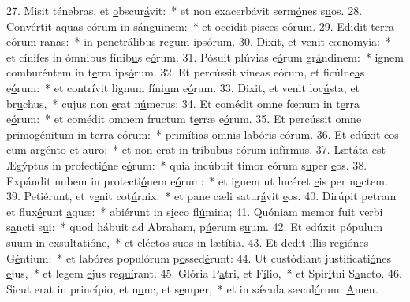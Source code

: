 27. Misit ténebras, et \uline{o}bscur\uline{á}vit:~* et non exacerbávit serm\uline{ó}nes s\uline{u}os.
28. Convértit aquas e\uline{ó}rum in s\uline{á}nguinem:~* et occídit p\uline{i}sces e\uline{ó}rum.
29. Edidit terra e\uline{ó}rum r\uline{a}nas:~* in penetrálibus r\uline{e}gum ips\uline{ó}rum.
30. Dixit, et venit cœn\uline{o}my\uline{í}a:~* et cínifes in ómnibus fínib\uline{u}s e\uline{ó}rum.
31. Pósuit plúvias e\uline{ó}rum gr\uline{á}ndinem:~* ignem comburéntem in t\uline{e}rra ips\uline{ó}rum.
32. Et percússit víneas eórum, et ficúlne\uline{a}s e\uline{ó}rum:~* et contrívit lignum fíni\uline{u}m e\uline{ó}rum.
33. Dixit, et venit loc\uline{ú}sta, et br\uline{u}chus,~* cujus non \uline{e}rat n\uline{ú}merus:
34. Et comédit omne fœnum in t\uline{e}rra e\uline{ó}rum:~* et comédit omnem fructum t\uline{e}rræ e\uline{ó}rum.
35. Et percússit omne primogénitum in t\uline{e}rra e\uline{ó}rum:~* primítias omnis lab\uline{ó}ris e\uline{ó}rum.
36. Et edúxit eos cum arg\uline{é}nto et \uline{au}ro:~* et non erat in tríbubus e\uline{ó}rum inf\uline{í}rmus.
37. Lætáta est Ægýptus in profecti\uline{ó}ne e\uline{ó}rum:~* quia incúbuit timor eórum s\uline{u}per \uline{e}os.
38. Expándit nubem in protecti\uline{ó}nem e\uline{ó}rum:~* et ignem ut lucéret \uline{e}is per n\uline{o}ctem.
39. Petiérunt, et v\uline{e}nit cot\uline{ú}rnix:~* et pane cæli satur\uline{á}vit \uline{e}os.
40. Dirúpit petram et flux\uline{é}runt \uline{a}quæ:~* abiérunt in s\uline{i}cco fl\uline{ú}mina;
41. Quóniam memor fuit verbi s\uline{a}ncti s\uline{u}i:~* quod hábuit ad Abraham, p\uline{ú}erum s\uline{u}um.
42. Et edúxit pópulum suum in exsult\uline{a}ti\uline{ó}ne,~* et eléctos suos \uline{i}n læt\uline{í}tia.
43. Et dedit illis regi\uline{ó}nes G\uline{é}ntium:~* et labóres populórum p\uline{o}ssed\uline{é}runt:
44. Ut custódiant justificati\uline{ó}nes \uline{e}jus,~* et legem \uline{e}jus re\uline{quí}rant.
45. Glória P\uline{a}tri, et F\uline{í}lio,~* et Spir\uline{í}tui S\uline{a}ncto.
46. Sicut erat in princípio, et n\uline{u}nc, et s\uline{e}mper,~* et in sǽcula sæcul\uline{ó}rum. \uline{A}men.
